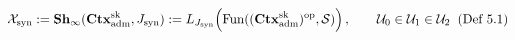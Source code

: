 \documentclass[preview]{standalone}
\begin{document}
\begin{align*}
\special{dvisvgm:raw <g id='unique000'>}\mathcal{X}_{\text{syn}} := \mathbf{Sh}_\infty(\mathbf{Ctx}_{\text{adm}}^{\text{sk}}, J_{\text{syn}}) := L_{J_{\text{syn}}}\!\left(\operatorname{Fun}((\mathbf{Ctx}_{\text{adm}}^{\text{sk}})^{\text{op}}, \mathcal{S})\right), \qquad \mathcal{U}_0 \in \mathcal{U}_1 \in \mathcal{U}_2\;\;(\text{Def 5.1})\special{dvisvgm:raw </g>}
\end{align*}
\end{document}
